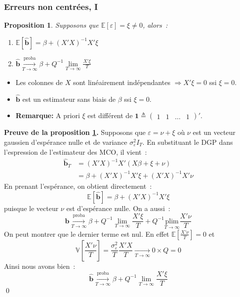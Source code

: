\documentclass[10pt]{beamer}
\newcommand{\plim}{\overset{\text{proba}}{\underset{T\rightarrow\infty}{\longrightarrow}}}
\newcommand{\epsvar}{\sigma_{\varepsilon}^2}
\theoremstyle{plain}
\newtheorem{prop}{Proposition}
\begin{document}
\begin{frame}
  \frametitle{Erreurs non centrées, I}

  \begin{prop}\label{prop:bhat:non-zero-mean-error}
    Supposons que $\mathbb E\left[\varepsilon\right] = \xi \neq 0$, alors~:
    \begin{enumerate}

    \item $\mathbb E\left[ \hat{\mathbf b} \right] = \beta + (X'X)^{-1}X'\xi$
    \item $\hat{\mathbf b} \plim \beta + Q^{-1}\underset{T\rightarrow\infty}{\lim} \frac{X'\xi}{T}$

    \end{enumerate}
  \end{prop}

  \bigskip

  \begin{itemize}

  \item Les colonnes de $X$ sont linéairement indépendantes $\Rightarrow$$X'\xi=0$ ssi $\xi=0$.\newline

  \item $\hat{\mathbf b}$ est un estimateur sans biais de $\beta$ ssi $\xi=0$.\newline

  \item \textbf{Remarque:} A priori $\xi$ est différent de $\mathbf 1 \triangleq \begin{pmatrix}1 & 1 & \dots & 1\end{pmatrix}'$.

  \end{itemize}

\end{frame}


\begin{notes}
  \textbf{Preuve de la proposition \ref{prop:bhat:non-zero-mean-error}.} Supposons que $\varepsilon = \nu + \xi$ où $\nu$ est un vecteur gaussien d'espérance nulle et de variance $\sigma_{\varepsilon}^2I_T$. En substituant le DGP dans l'espression de l'estimateur des MCO, il vient~:
  \[
    \begin{split}
      \hat{\mathbf b}_T &= (X'X)^{-1}X'\left( X\beta + \xi + \nu\right)\\
      &= \beta + (X'X)^{-1}X'\xi + (X'X)^{-1}X'\nu
    \end{split}
  \]
  En prenant l'espérance, on obtient directement~:
  \[
    \mathbb E\left[ \hat{\mathbf b} \right] = \beta + (X'X)^{-1}X'\xi
  \]
  puisque le vecteur $\nu$ est d'espérance nulle. On a aussi~:
  \[
    \hat{\mathbf b} \plim \beta + Q^{-1}\underset{T\rightarrow\infty}{\lim}\frac{X'\xi}{T} + Q^{-1}\underset{T\rightarrow\infty}{\text{plim}}\frac{X'\nu}{T}
  \]
  On peut montrer que le dernier terme est nul. En effet $\mathbb E\left[\frac{X'\nu}{T}\right]=0$ et
  \[
    \mathbb V \left[ \frac{X'\nu}{T} \right] = \frac{\epsvar}{T}\frac{X'X}{T} \underset{T\rightarrow\infty}{\longrightarrow} 0\times Q = 0
  \]
  Ainsi nous avons bien~:
  \[
    \hat{\mathbf b} \plim \beta + Q^{-1}\underset{T\rightarrow\infty}{\lim}\frac{X'\xi}{T}
  \]
\qed
\end{notes}
\end{document}
